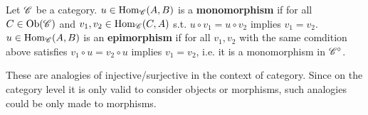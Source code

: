 \begin{definition}
    Let $\mathscr{C}$ be a category. $u\in \mathrm{Hom}_{\mathscr{C}}(A, B)$ is a \textbf{monomorphism} if for all $C \in \mathrm{Ob}(\mathscr{C})$ and $v_1, v_2 \in \mathrm{Hom}_{\mathscr{C}}(C, A)$ s.t. $u \circ v_1 = u \circ v_2$ implies $v_1 = v_2$. $u\in \mathrm{Hom}_{\mathscr{C}}(A, B)$ is an \textbf{epimorphism} if for all $v_1, v_2$ with the same comdition above satisfies $v_1 \circ u = v_2 \circ u$ implies $v_1 = v_2$, i.e. it is a monomorphism in $\mathscr{C}^{\circ}$.
\end{definition}

\begin{remark}
    These are analogies of injective/surjective in the context of category. Since on the category level it is only valid to consider objects or morphisms, such analogies could be only made to morphisms.
\end{remark}

